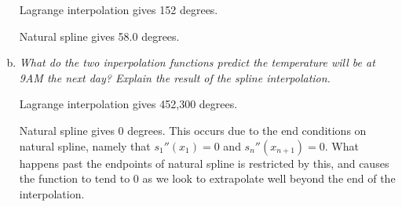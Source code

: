 \documentclass{article}
\begin{document}
\begin{enumerate}[(a)]
    Lagrange interpolation gives 152 degrees.

    Natural spline gives 58.0 degrees.
  \item \textit{What do the two inperpolation functions predict the temperature will be at 9AM the next day? Explain the result of the spline interpolation.}

    Lagrange interpolation gives 452,300 degrees.

    Natural spline gives 0 degrees. This occurs due to the end conditions on natural spline, namely that $s_1''(x_1) = 0$ and $s_n''(x_{n+1}) = 0$. What happens past the endpoints of natural spline is restricted by this, and causes the function to tend to 0 as we look to extrapolate well beyond the end of the interpolation.
    
\end{enumerate}
\end{document}
